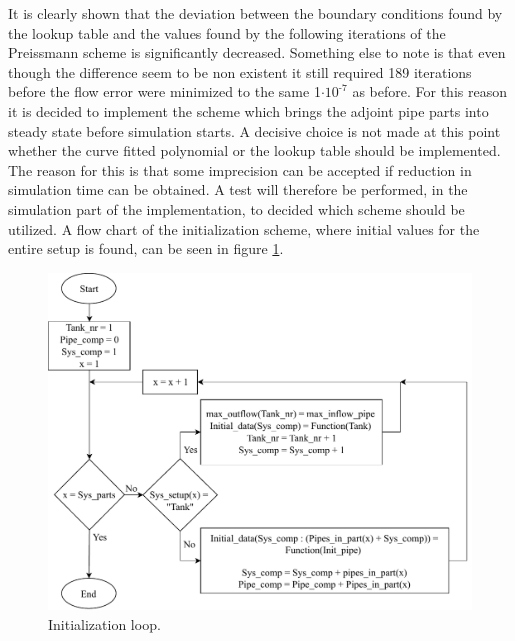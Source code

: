It is clearly shown that the deviation between the boundary conditions found by the lookup table and the values found by the following iterations of the Preissmann scheme is significantly decreased.
Something else to note is that even though the difference seem to be non existent it still required 189 iterations before the flow error were minimized to the same 1$\cdot \text{10}^{\text{-7}}$ as before. For this reason it is decided to implement the scheme which brings the adjoint pipe parts into steady state before simulation starts. A decisive choice is not made at this point whether the curve fitted polynomial or the lookup table should be implemented. The reason for this is that some imprecision can be accepted if reduction in simulation time can be obtained. A test will therefore be performed, in the simulation part of the implementation, to decided which scheme should be utilized. A flow chart of the initialization scheme, where initial values for the entire setup is found, can be seen in figure \ref{fig:init_sys_dia}.

\begin{figure}[H]
\centering
\includegraphics[width=1.05 \textwidth]{report/simulation/pictures/init_sys_dia.pdf}
\caption{Initialization loop.}
\label{fig:init_sys_dia}
\end{figure}

